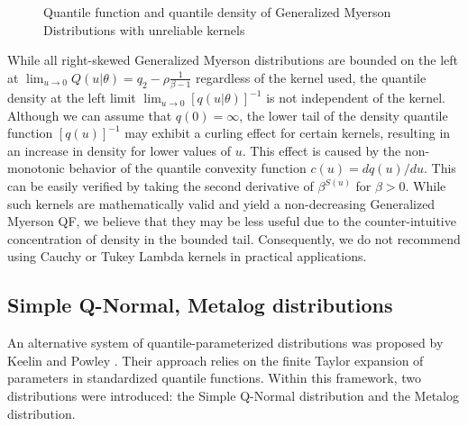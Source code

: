 \documentclass[
  fleqn,
  deca,
  blindrev
]{informs4}
\begin{document}
\begin{figure}


\caption{\label{fig-gmyerson-qfdqf-plot2}Quantile function and quantile
density of Generalized Myerson Distributions with unreliable kernels}

\end{figure}%

While all right-skewed Generalized Myerson distributions are bounded on
the left at
\(\lim_{u\rightarrow0}Q(u\vert\theta)=q_2-\rho\frac{1}{\beta-1}\)
regardless of the kernel used, the quantile density at the left limit
\(\lim_{u\rightarrow0}[q(u\vert\theta)]^{-1}\) is not independent of the
kernel. Although we can assume that \(q(0)=\infty\), the lower tail of
the density quantile function \([q(u)]^{-1}\) may exhibit a curling
effect for certain kernels, resulting in an increase in density for
lower values of \(u\). This effect is caused by the non-monotonic
behavior of the quantile convexity function \(c(u)=dq(u)/du\). This can
be easily verified by taking the second derivative of \(\beta^{S(u)}\)
for \(\beta>0\). While such kernels are mathematically valid and yield a
non-decreasing Generalized Myerson QF, we believe that they may be less
useful due to the counter-intuitive concentration of density in the
bounded tail. Consequently, we do not recommend using Cauchy or Tukey
Lambda kernels in practical applications.

\subsection{Simple Q-Normal, Metalog
distributions}\label{simple-q-normal-metalog-distributions}

An alternative system of quantile-parameterized distributions was
proposed by Keelin and Powley
\citep{keelin2011QuantileParameterizedDistributions, powley2013QuantileFunctionMethods}.
Their approach relies on the finite Taylor expansion of parameters in
standardized quantile functions. Within this framework, two
distributions were introduced: the Simple Q-Normal distribution and the
Metalog distribution.
\end{document}
